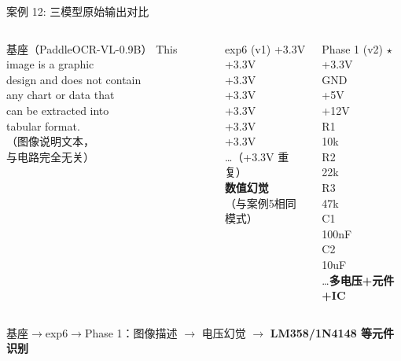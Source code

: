 \documentclass[10pt,aspectratio=169,table]{beamer}
\begin{document}
\begin{frame}{案例 12: 三模型原始输出对比}
  \begin{columns}[T]
      \begin{block}{\footnotesize 基座（PaddleOCR-VL-0.9B）}
        \ttfamily\tiny
        This image is a graphic\\
        design and does not contain\\
        any chart or data that\\
        can be extracted into\\
        tabular format.\\
        （图像说明文本，\\
        与电路完全无关）
      \end{block}
      \begin{block}{\footnotesize exp6 (v1)}
        \ttfamily\tiny
        +3.3V\\
        +3.3V\\
        +3.3V\\
        +3.3V\\
        +3.3V\\
        +3.3V\\
        +3.3V\\
        \ldots（+3.3V 重复）\\
        \textbf{数值幻觉}\\
        （与案例5相同模式）
      \end{block}
      \begin{block}{\footnotesize Phase 1 (v2) $\star$}
        \ttfamily\tiny
        +3.3V\\
        GND\\
        +5V\\
        +12V\\
        R1\\
        10k\\
        R2\\
        22k\\
        R3\\
        47k\\
        C1\\
        100nF\\
        C2\\
        10uF\\
        \ldots\textbf{多电压+元件+IC}
      \end{block}
  \end{columns}
  \vspace{0.2cm}
  \begin{center}
    \footnotesize 基座$\to$exp6$\to$Phase 1：图像描述 $\to$ 电压幻觉 $\to$ \textbf{LM358/1N4148 等元件识别}
  \end{center}
\end{frame}
\end{document}
